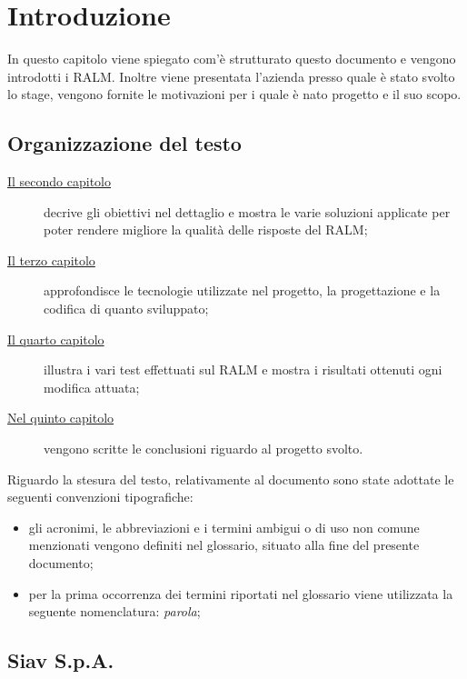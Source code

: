 \chapter{Introduzione}
\label{cap:introduzione}

In questo capitolo viene spiegato com'è strutturato questo documento e vengono introdotti i RALM.
Inoltre viene presentata l'azienda presso quale è stato svolto lo stage, vengono 
fornite le motivazioni per i quale è nato progetto e il suo scopo.

\section{Organizzazione del testo}

\begin{description}
    \item[{\hyperref[cap:analisi-preliminare]{Il secondo capitolo}}] decrive gli obiettivi nel dettaglio e mostra le varie soluzioni applicate per poter rendere migliore la qualità delle risposte del RALM;
    
    \item[{\hyperref[cap:progettazione-codifica]{Il terzo capitolo}}] approfondisce le tecnologie utilizzate nel progetto, la progettazione e la codifica di quanto sviluppato;
    
    \item[{\hyperref[cap:verifica-validazione]{Il quarto capitolo}}] illustra i vari test effettuati sul RALM e mostra i risultati ottenuti ogni modifica attuata;
    
    \item[{\hyperref[cap:conclusioni]{Nel quinto capitolo}}] vengono scritte le conclusioni riguardo al progetto svolto.
\end{description}

Riguardo la stesura del testo, relativamente al documento sono state adottate le seguenti convenzioni tipografiche:
\begin{itemize}
	\item gli acronimi, le abbreviazioni e i termini ambigui o di uso non comune menzionati vengono definiti nel glossario, situato alla fine del presente documento; 
	\item per la prima occorrenza dei termini riportati nel glossario viene utilizzata la seguente nomenclatura: \emph{parola}\glsfirstoccur;
\end{itemize}

\section{Siav S.p.A.}

